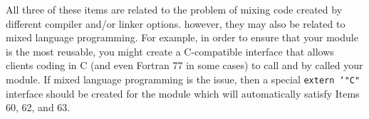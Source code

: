 All three of these items are related to the problem of mixing code created by
different compiler and/or linker options.  however, they may also be related
to mixed language programming.  For example, in order to ensure that your
module is the most reusable, you might create a C-compatible interface that
allows clients coding in C (and even Fortran 77 in some cases) to call and by
called your module.  If mixed language programming is the issue, then a
special {}\texttt{extern `"C"} interface should be created for the module
which will automatically satisfy Items 60, 62, and 63.
